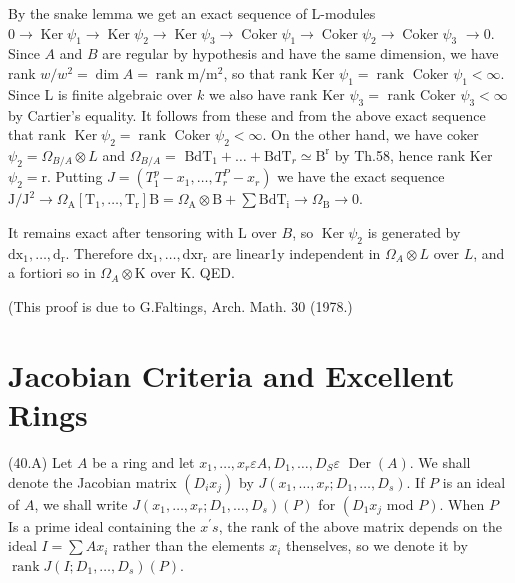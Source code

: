 By the snake lemma we get an exact sequence of L-modules $0 \rightarrow \operatorname{Ker} \psi_{1} \rightarrow \operatorname{Ker} \psi_{2} \rightarrow \operatorname{Ker} \psi_{3} \rightarrow \operatorname{Coker} \psi_{1} \rightarrow \operatorname{Coker} \psi_{2} \rightarrow \operatorname{Coker} \psi_{3}$ $\rightarrow 0 .$ Since $A$ and $B$ are regular by hypothesis and have the same dimension, we have rank $w / w^{2}=\operatorname{dim} A=\operatorname{rank} \mathrm{m} / \mathrm{m}^{2}$, so that rank Ker $\psi_{1}=\operatorname{rank}$ Coker $\psi_{1}<\infty .$ Since L is finite algebraic over $k$ we also have rank Ker $\psi_{3}=$ rank Coker $\psi_{3}<\infty$ by Cartier's equality. It follows from these and from the above exact sequence that rank $\operatorname{Ker} \psi_{2}=\operatorname{rank}$ Coker $\psi_{2}<\infty$. On the other hand, we have coker $\psi_{2}=\Omega_{B / A} \otimes L$ and $\Omega_{B / A}=$ $\mathrm{BdT}_{1}+\ldots+\mathrm{BdT}_{r} \simeq \mathrm{B}^{\mathrm{r}}$ by Th.58, hence rank Ker $\psi_{2}=\mathrm{r}$. Putting $J=\left(T_{1}^{p}-x_{1}, \ldots, T_{r}^{P}-x_{r}\right)$ we have the exact sequence $\mathrm{J} / \mathrm{J}^{2} \rightarrow \Omega_{\mathrm{A}}\left[\mathrm{T}_{1}, \ldots, \mathrm{T}_{\mathrm{r}}\right] \mathrm{B}=\Omega_{\mathrm{A}} \otimes \mathrm{B}+\sum \mathrm{BdT}_{\mathrm{i}} \rightarrow \Omega_{\mathrm{B}} \rightarrow 0$.

It remains exact after tensoring with $\mathrm{L}$ over $B$, so $\operatorname{Ker} \psi_{2}$ is generated by $\mathrm{d} \mathrm{x}_{1}, \ldots, \mathrm{d}_{\mathrm{r}}$. Therefore $\mathrm{d} \mathrm{x}_{1}, \ldots, \mathrm{dx} \mathrm{r}_{\mathrm{r}}$ are linear1y independent in $\Omega_{A} \otimes L$ over $L$, and a fortiori so in $\Omega_{A} \otimes \mathrm{K}$ over K. QED.

(This proof is due to G.Faltings, Arch. Math. 30 (1978.)

\section{Jacobian Criteria and Excellent Rings}
(40.A) Let $A$ be a ring and let $x_{1}, \ldots, x_{r} \varepsilon A, D_{1}, \ldots, D_{S} \varepsilon$ $\operatorname{Der}(A)$. We shall denote the Jacobian matrix $\left(D_{i} x_{j}\right)$ by $J\left(x_{1}, \ldots, x_{r} ; D_{1}, \ldots, D_{s}\right)$. If $P$ is an ideal of $A$, we shall write $J\left(x_{1}, \ldots, x_{r} ; D_{1}, \ldots, D_{s}\right)(P)$ for $\left(D_{1} x_{j}\right.$ mod $\left.P\right)$. When $P$ Is a prime ideal containing the $x^{\prime} s$, the rank of the above matrix depends on the ideal $I=\sum A x_{i}$ rather than the elements $x_{i}$ thenselves, so we denote it by $\operatorname{rank} J\left(I ; D_{1}, \ldots, D_{s}\right)(P)$.

